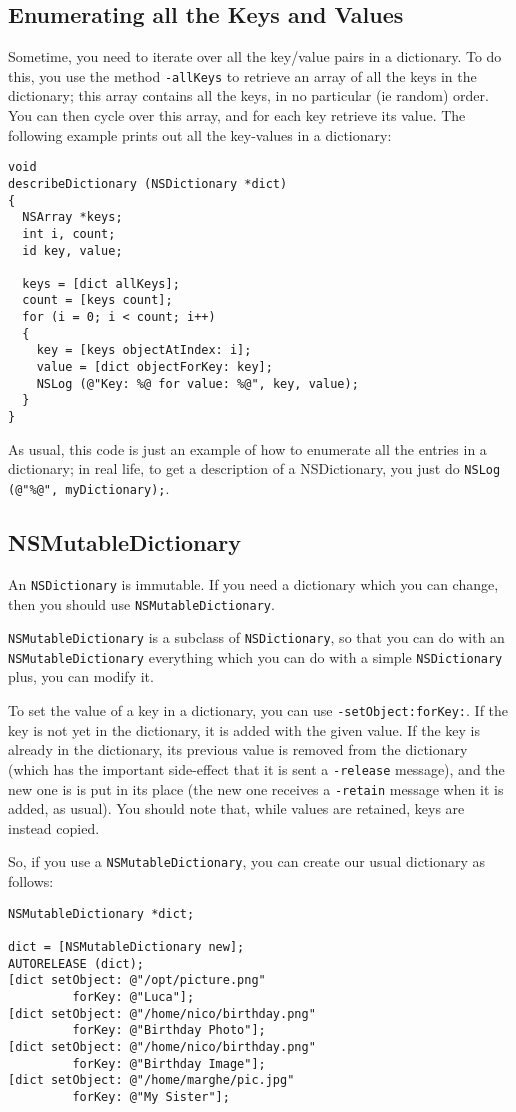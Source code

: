 \documentclass[a4paper]{article}
\begin{document}
\subsection{Enumerating all the Keys and Values}
Sometime, you need to iterate over all the key/value pairs 
in a dictionary.  To do this, you use the method \texttt{-allKeys} 
to retrieve an array of all the keys in the dictionary; this array 
contains all the keys, in no particular (ie random) order. 
You can then cycle over this array, and for each key retrieve 
its value.  The following example prints out all the key-values 
in a dictionary:
\begin{verbatim}
void
describeDictionary (NSDictionary *dict)
{ 
  NSArray *keys;
  int i, count;
  id key, value;

  keys = [dict allKeys];
  count = [keys count];
  for (i = 0; i < count; i++)
  {
    key = [keys objectAtIndex: i];
    value = [dict objectForKey: key];
    NSLog (@"Key: %@ for value: %@", key, value);
  }
}
\end{verbatim}
As usual, this code is just an example of how to enumerate all the 
entries in a dictionary; in real life, to get a description of a NSDictionary, 
you just do \texttt{NSLog (@"\%@", myDictionary);}.

\subsection{NSMutableDictionary}
An \texttt{NSDictionary} is immutable.  If you need a dictionary which
you can change, then you should use \texttt{NSMutableDictionary}.

\texttt{NSMutableDictionary} is a subclass of \texttt{NSDictionary},
so that you can do with an \texttt{NSMutableDictionary} everything
which you can do with a simple \texttt{NSDictionary} plus, you can
modify it.

To set the value of a key in a dictionary, you can use
\texttt{-setObject:forKey:}.  If the key is not yet in the dictionary,
it is added with the given value.  If the key is already in the
dictionary, its previous value is removed from the dictionary (which
has the important side-effect that it is sent a \texttt{-release}
message), and the new one is is put in its place (the new one receives
a \texttt{-retain} message when it is added, as usual).  You should
note that, while values are retained, keys are instead copied.

So, if you use a \texttt{NSMutableDictionary}, you can create 
our usual dictionary as follows: 
\begin{verbatim}
NSMutableDictionary *dict;

dict = [NSMutableDictionary new];
AUTORELEASE (dict);
[dict setObject: @"/opt/picture.png"        
         forKey: @"Luca"]; 
[dict setObject: @"/home/nico/birthday.png" 
         forKey: @"Birthday Photo"];
[dict setObject: @"/home/nico/birthday.png" 
         forKey: @"Birthday Image"];
[dict setObject: @"/home/marghe/pic.jpg"    
         forKey: @"My Sister"];
\end{verbatim}
\end{document}
